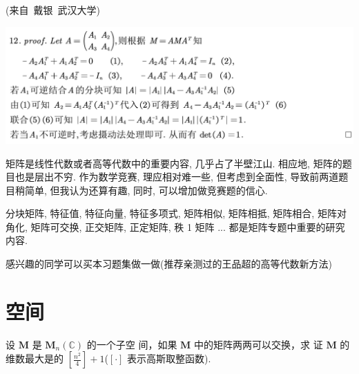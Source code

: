 \documentclass[a4paper, 12pt, UTF8]{ctexart}
\begin{document}
(来自\ 戴银\ 武汉大学)

{\centering
  \includegraphics[width = \textwidth]{images/solution2.pdf}
}

\vspace{4em}

\begin{thm}{}{}
    {\adkaiti 矩阵是线性代数或者高等代数中的重要内容, 几乎占了半壁江山. 相应地, 矩阵的题目也是层出不穷. 作为数学竞赛, 理应相对难一些, 但考虑到全面性, 导致前两道题目稍简单, 但我认为还算有趣, 同时, 可以增加做竞赛题的信心.

      分块矩阵, 特征值, 特征向量, 特征多项式, 矩阵相似, 矩阵相抵, 矩阵相合, 矩阵对角化, 矩阵可交换, 正交矩阵, 正定矩阵, 秩 1 矩阵 ... 都是矩阵专题中重要的研究内容.

      感兴趣的同学可以买本习题集做一做(推荐亲测过的王品超的高等代数新方法)

    }
\end{thm}

\clearpage
\section{空间}

\begin{exa}
    设 $\boldsymbol{M}$ 是 $\boldsymbol{M}_{n}(\mathbb{C})$ 的一个子空
    间，如果 $\boldsymbol{M}$ 中的矩阵两两可以交换，求
    证 $\boldsymbol{M}$ 的维数最大是的 $\left[ \frac{n^{2}}{4}
    \right]+1$($\left[ \cdot \right]$ 表示高斯取整函数).
\end{exa}
\end{document}
